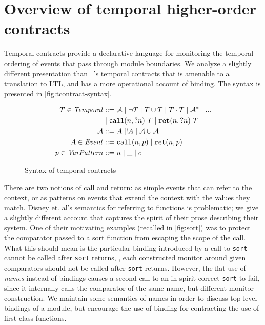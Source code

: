 \documentclass[preprint,onecolumn,9pt]{sigplanconf} %
\begin{document}
\section{Overview of temporal higher-order contracts}

Temporal contracts provide a declarative language for monitoring the temporal ordering of events that pass through module boundaries.
%
We analyze a slightly different presentation than ~\citep{ianjohnson:dfm:icfp2011}'s temporal contracts that is amenable to a translation to LTL, and has a more operational account of binding.
%
The syntax is presented in \autoref{fig:tcontract-syntax}.
%
\begin{figure}
  \begin{align*}
 T \in \mathit{Temporal} &::=
      {\mathcal A}
 \mid \neg T
 \mid T \cup T
 \mid T \cdot T
 \mid {\mathcal A}^*
 \mid {\tt ...} \\
&\mid {\tt call}(n, {\tt ?}n)\ T
 \mid {\tt ret}(n, {\tt ?}n)\ T \\
{\mathcal A} &::= A \mid ! A \mid {\mathcal A} \cup {\mathcal A} \\
A \in \mathit{Event} &::= {\tt call}(n, p) \mid {\tt ret}(n, p) \\
p \in \mathit{VarPattern} &::= n \mid \_ \mid c
  \end{align*}
  \caption{Syntax of temporal contracts}
  \label{fig:tcontract-syntax}
\end{figure}

There are two notions of call and return: as simple events that can refer to the context, or as patterns on events that extend the context with the values they match.
%
Disney et. al's semantics for referring to functions is problematic; we give a slightly different account that captures the spirit of their prose describing their system.
%
One of their motivating examples (recalled in \autoref{fig:sort}) was to protect the comparator passed to a sort function from escaping the scope of the call.
%
What this should mean is the particular binding introduced by a call to {\tt sort} cannot be called after {\tt sort} returns, \ie, each constructed monitor around given comparators should not be called after {\tt sort} returns.
%
However, the flat use of \emph{names} instead of bindings causes a second call to an in-spirit-correct {\tt sort} to fail, since it internally calls the comparator of the same name, but different monitor construction.
%
We maintain some semantics of names in order to discuss top-level bindings of a module, but encourage the use of binding for contracting the use of first-class functions.
\end{document}
